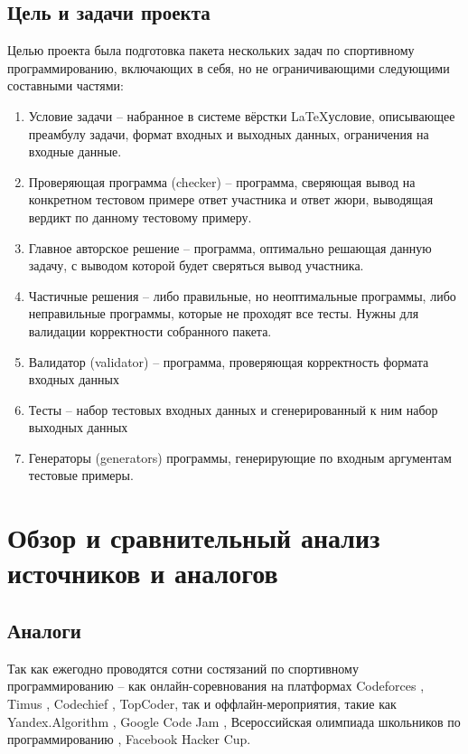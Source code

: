 \documentclass[a4paper]{article}
\begin{document}
\subsection{Цель и задачи проекта}

Целью проекта была подготовка пакета нескольких задач по спортивному программированию, включающих в себя, но не ограничивающими следующими составными частями:
\begin{enumerate}
\item Условие задачи -- набранное в системе вёрстки \LaTeX условие, описывающее преамбулу задачи, формат входных и выходных данных, ограничения на входные данные.
\item Проверяющая программа (checker) -- программа, сверяющая вывод на конкретном тестовом примере ответ участника и ответ жюри, выводящая вердикт по данному тестовому примеру.
\item Главное авторское решение -- программа, оптимально решающая данную задачу, с выводом которой будет сверяться вывод участника.
\item Частичные решения -- либо правильные, но неоптимальные программы, либо неправильные программы, которые не проходят все тесты. Нужны для валидации корректности собранного пакета.
\item Валидатор (validator) -- программа, проверяющая корректность формата входных данных
\item Тесты -- набор тестовых входных данных и сгенерированный к ним набор выходных данных
\item Генераторы (generators) программы, генерирующие по входным аргументам тестовые примеры.
\end{enumerate}

\newpage
\section{Обзор и сравнительный анализ источников и аналогов}

\subsection{Аналоги}

Так как ежегодно проводятся сотни состязаний по спортивному программированию -- как онлайн-соревнования на платформах Codeforces \cite{Codeforces}, Timus \cite{Timus}, Codechief \cite{Codechief}, TopCoder\cite{TopCoder}, так и оффлайн-мероприятия, такие как Yandex.Algorithm \cite{YaAlgorithm}, Google Code Jam \cite{CodeJam}, Всероссийская олимпиада школьников по программированию \cite{Roi}, Facebook Hacker Cup.
\end{document}
